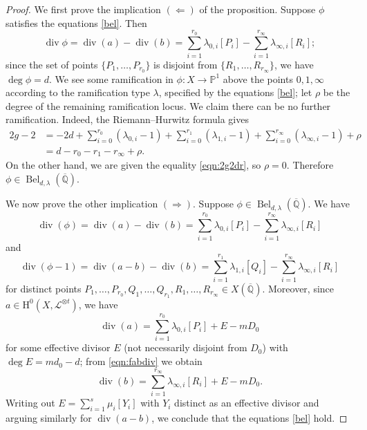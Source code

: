 \documentclass{amsproc}
\numberwithin{equation}{section}
\numberwithin{figure}{section}
\theoremstyle{definition}
\theoremstyle{remark}
\DeclareMathOperator{\opdiv}{div}
\newcommand{\Qbar}{\overline{\mathbb{Q}}}
\newcommand{\scrL}{\mathscr{L}}
\newcommand\PP{\mathbb{P}}
\newcommand\Hzero{\mathrm{H}^0}
\DeclareMathOperator{\Bel}{Bel}
\newcommand{\jv}[1]{{\color{red} \textsf{[[#1]]}}}
\newcommand{\aj}[1]{{\color{magenta} \textsf{[[#1]]}}}
\begin{document}
\begin{proof} %
We first prove the implication $(\Leftarrow)$ of the proposition.  Suppose $\phi$ satisfies the equations \eqref{bel}.  Then 
\[ \opdiv \phi = \opdiv(a) - \opdiv(b) = \sum_{i=1}^{r_0} \lambda_{0,i}[P_i] - \sum_{i=1}^{r_\infty} \lambda_{\infty,i}[R_i]; \]
since the set of points $\{P_1,\dots,P_{r_0}\}$ is disjoint from $\{R_1,\dots,R_{r_\infty}\}$, we have $\deg \phi = d$.  We see some ramification in $\phi\colon X \to \PP^1$ above the points $0,1,\infty$ according to the ramification type $\lambda$, specified by the equations \eqref{bel}; let $\rho$ be the degree of the remaining ramification locus.  We claim there can be no further ramification.  Indeed, the Riemann--Hurwitz formula gives
\begin{equation}
\begin{aligned}
2g-2 &= -2 d + \sum_{i=0}^{r_0} \left(\lambda_{0,i} - 1\right) + \sum_{i=0}^{r_1} \left(\lambda_{1,i} - 1\right)
+ \sum_{i=0}^{r_\infty} \left(\lambda_{\infty,i} - 1\right) + \rho \\
&= d-r_0-r_1-r_\infty+\rho.
\end{aligned}
\end{equation}
On the other hand, we are given the equality \ref{eqn:2g2dr}, so $\rho=0$.  Therefore $\phi \in \Bel_{d,\lambda}(\Qbar)$.  

We now prove the other implication $(\Rightarrow)$.  Suppose $\phi \in \Bel_{d,\lambda}(\Qbar)$.  We have 
\begin{equation} \label{eqn:fabdiv}
\opdiv(\phi) = \opdiv(a)-\opdiv(b) = \sum_{i=1}^{r_0} \lambda_{0,i}[P_i] - \sum_{i=1}^{r_\infty} \lambda_{\infty,i}[R_i] 
\end{equation}
and
\begin{equation} 
\opdiv(\phi-1) = \opdiv(a-b)-\opdiv(b) = \sum_{i=1}^{r_1} \lambda_{1,i}[Q_i] - \sum_{i=1}^{r_\infty} \lambda_{\infty,i}[R_i] 
\end{equation}
for distinct points $P_1,\dots,P_{r_0},Q_1,\dots,Q_{r_1},R_1,\dots,R_{r_\infty} \in X(\Qbar)$.  Moreover, since $a \in \Hzero(X,\scrL^{\otimes t})$, we have
\[ \opdiv(a) = \sum_{i=1}^{r_0} \lambda_{0,i}[P_i] + E - mD_0 \]
for some effective divisor $E$ (not necessarily disjoint from $D_0$) with $\deg E = md_0-d$; from \eqref{eqn:fabdiv} we obtain
\[ \opdiv(b) = \sum_{i=1}^{r_\infty} \lambda_{\infty,i}[R_i] + E - mD_0. \]
Writing out $E=\sum_{i=1}^s \mu_i [Y_i]$ with $Y_i$ distinct as an effective divisor and arguing similarly for $\opdiv(a-b)$, we conclude that the equations \eqref{bel} hold.
\end{proof}
\end{document}
